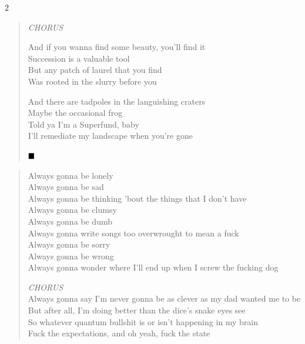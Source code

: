 \documentclass[11pt]{book}
\begin{document}
\begin{multicols}{2}
\begin{verse}
\hspace{2em} \emph{CHORUS}

\hspace{2em} And if you wanna find some beauty, you'll find it \\
\hspace{2em} Succession is a valuable tool \\
\hspace{2em} But any patch of laurel that you find \\
\hspace{2em} Was rooted in the slurry before you

\hspace{2em} And there are tadpoles in the languishing craters \\
\hspace{2em} Maybe the occasional frog \\
\hspace{2em} Told ya I'm a Superfund, baby \\
\hspace{2em} I'll remediate my landscape when you're gone

$\hfill\blacksquare$
\end{verse}

\begin{verse}

\tiny
Always gonna be lonely \\
Always gonna be sad \\
Always gonna be thinking 'bout the things that I don't have \\
Always gonna be clumsy \\
Always gonna be dumb \\
Always gonna write songs too overwrought to mean a fuck \\
Always gonna be sorry \\
Always gonna be wrong \\
Always gonna wonder where I'll end up when I screw the fucking dog

\hspace{2em} \emph{CHORUS} \\
\hspace{2em} Always gonna say I'm never gonna be as clever as my dad wanted me to be \\
\hspace{2em} But after all, I'm doing better than the dice's snake eyes see \\
\hspace{2em} So whatever quantum bullshit is or isn't happening in my brain \\
\hspace{2em} Fuck the expectations, and oh yeah, fuck the state


\end{verse}
\end{multicols}
\end{document}
